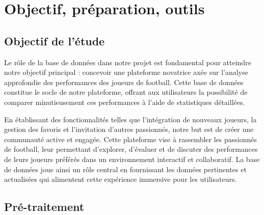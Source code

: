 \documentclass[
]{article}
\begin{document}
\bigskip

\hypertarget{objectif-pruxe9paration-outils}{%
\section{Objectif, préparation,
outils}\label{objectif-pruxe9paration-outils}}

\hypertarget{objectif-de-luxe9tude}{%
\subsection{Objectif de l'étude}\label{objectif-de-luxe9tude}}

\bigskip
\begin{flushleft}
Le rôle de la base de données dans notre projet est fondamental pour atteindre notre objectif principal : concevoir une plateforme novatrice axée sur l'analyse approfondie des performances des joueurs de football. Cette base de données constitue le socle de notre plateforme, offrant aux utilisateurs la possibilité de comparer minutieusement ces performances à l'aide de statistiques détaillées.

En établissant des fonctionnalités telles que l'intégration de nouveaux joueurs, la gestion des favoris et l'invitation d'autres passionnés, notre but est de créer une communauté active et engagée. Cette plateforme vise à rassembler les passionnés de football, leur permettant d'explorer, d'évaluer et de discuter des performances de leurs joueurs préférés dans un environnement interactif et collaboratif. La base de données joue ainsi un rôle central en fournissant les données pertinentes et actualisées qui alimentent cette expérience immersive pour les utilisateurs.
\end{flushleft}

\hypertarget{pruxe9-traitement}{%
\subsection{Pré-traitement}\label{pruxe9-traitement}}

\bigskip
\end{document}
